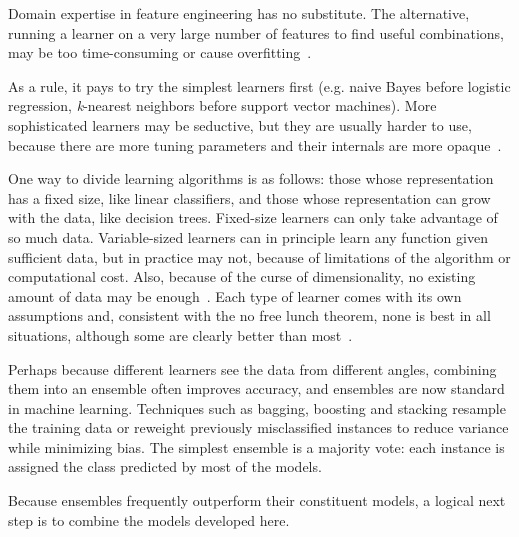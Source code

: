 Domain expertise in feature engineering has no substitute. The alternative, running a learner on a very large number of features to find useful combinations, may be too time-consuming or cause overfitting~\cite{Eklund2014}.

As a rule, it pays to try the simplest learners first (e.g. naive Bayes before logistic regression, \textit{k}-nearest neighbors before support vector machines). More sophisticated learners may be seductive, but they are usually harder to use, because there are more tuning parameters and their internals are more opaque~\cite{Domingos2012}.

One way to divide learning algorithms is as follows: those whose representation has a fixed size, like linear classifiers, and those whose representation can grow with the data, like decision trees. Fixed-size learners can only take advantage of so much data. Variable-sized learners can in principle learn any function given sufficient data, but in practice may not, because of limitations of the algorithm or computational cost. Also, because of the curse of dimensionality, no existing amount of data may be enough~\cite{Domingos2012}. Each type of learner comes with its own assumptions and, consistent with the no free lunch theorem, none is best in all situations, although some are clearly better than most~\cite{Hand2006,Delgado2014}.

Perhaps because different learners see the data from different angles, combining them into an ensemble often improves accuracy, and ensembles are now standard in machine learning. Techniques such as bagging, boosting and stacking resample the training data or reweight previously misclassified instances to reduce variance while minimizing bias. The simplest ensemble is a majority vote: each instance is assigned the class predicted by most of the models.


Because ensembles frequently outperform their constituent models, a logical next step is to combine the models developed here.

